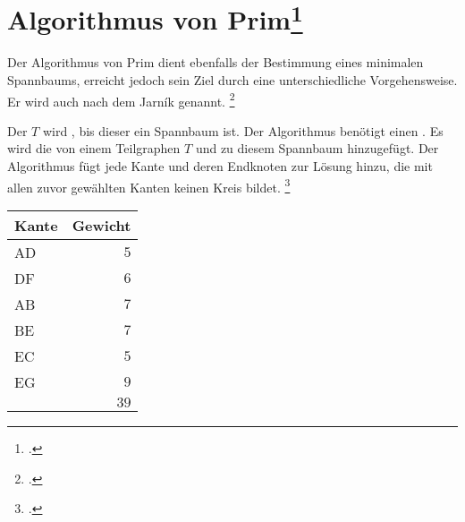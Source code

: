 \documentclass{lehramt-informatik-haupt}
\begin{document}

%

\section{Algorithmus von Prim\footcite{wiki:prim}}

Der Algorithmus von Prim dient ebenfalls der Bestimmung eines minimalen
Spannbaums, erreicht jedoch sein Ziel durch eine unterschiedliche
Vorgehensweise. Er wird auch nach dem  Jarník genannt.
\footcite{wiki:prim}

Der  $T$ wird , bis
dieser ein Spannbaum ist. Der Algorithmus benötigt einen
. Es wird die  von
einem Teilgraphen $T$  und zu diesem
Spannbaum hinzugefügt. Der Algorithmus fügt jede Kante und deren
Endknoten zur Lösung hinzu, die mit allen zuvor gewählten Kanten keinen
Kreis bildet.
\footcite[Seite 32, (PDF 26)]{aud:fs:6}

\begin{minipage}{7cm}
\end{minipage}
\begin{minipage}{4cm}
\begin{center}
\begin{tabular}{|l|r|}
\hline
Kante & Gewicht\\\hline\hline
AD & $5$\\
DF & $6$\\
AB & $7$\\
BE & $7$\\
EC & $5$\\
EG & $9$\\\hline
   & $39$\\\hline
\end{tabular}
\end{center}
\end{minipage}


%
\end{document}
